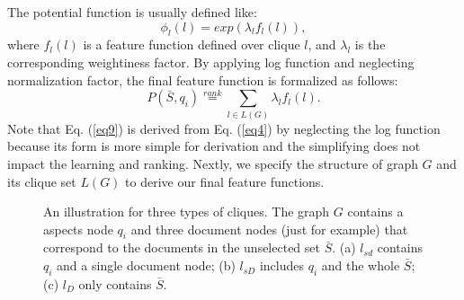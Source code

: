 \documentclass[review]{elsarticle}
\begin{document}
The potential function is usually defined like:
\begin{equation}
	\phi_l(l)=exp(\lambda_lf_l(l)),
\end{equation}
where $f_l(l)$ is a feature function defined over clique $l$, and $\lambda_l$ is the corresponding weightiness factor. By applying log function and neglecting normalization factor, the final feature function is formalized as follows:
\begin{equation}
	P(\bar{S},q_i)\overset{rank}{=}\sum_{l\in L(G)}\lambda_lf_l(l).
	\label{eq9}
\end{equation}
Note that Eq. (\ref{eq9}) is derived from Eq. (\ref{eq4}) by neglecting the log function because its form is more simple for derivation and the simplifying does not impact the learning and ranking.
Nextly, we specify the structure of graph $G$ and its clique set $L(G)$ to derive our final feature functions.


\begin{figure}[htb]
\centering
{}
\caption{An illustration for three types of cliques. The graph $G$ contains a aspects node $q_i$ and three document nodes (just for example) that correspond to the documents in the unselected set $\bar{S}$. (a) $l_{sd}$ contains $q_i$ and a single document node; (b) $l_{sD}$ includes $q_i$ and the whole $\bar{S}$; (c) $l_{D}$ only contains $\bar{S}$.}
\label{MRF}
\end{figure}
\end{document}
